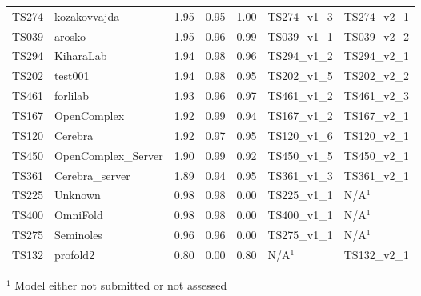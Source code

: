 \begin{table}[ht]
{\begin{tabular}{llrrrll}
TS274 & kozakovvajda & 1.95 & 0.95 & 1.00 & TS274\_v1\_3 & TS274\_v2\_1 \\ 
TS039 & arosko & 1.95 & 0.96 & 0.99 & TS039\_v1\_1 & TS039\_v2\_2 \\ 
TS294 & KiharaLab & 1.94 & 0.98 & 0.96 & TS294\_v1\_2 & TS294\_v2\_1 \\ 
TS202 & test001 & 1.94 & 0.98 & 0.95 & TS202\_v1\_5 & TS202\_v2\_2 \\ 
TS461 & forlilab & 1.93 & 0.96 & 0.97 & TS461\_v1\_2 & TS461\_v2\_3 \\ 
TS167 & OpenComplex & 1.92 & 0.99 & 0.94 & TS167\_v1\_2 & TS167\_v2\_1 \\ 
TS120 & Cerebra & 1.92 & 0.97 & 0.95 & TS120\_v1\_6 & TS120\_v2\_1 \\ 
TS450 & OpenComplex\_Server & 1.90 & 0.99 & 0.92 & TS450\_v1\_5 & TS450\_v2\_1 \\ 
TS361 & Cerebra\_server & 1.89 & 0.94 & 0.95 & TS361\_v1\_3 & TS361\_v2\_1 \\ 
TS225 & Unknown & 0.98 & 0.98 & 0.00 & TS225\_v1\_1 & N/A$^{1}$ \\ 
TS400 & OmniFold & 0.98 & 0.98 & 0.00 & TS400\_v1\_1 & N/A$^{1}$ \\ 
TS275 & Seminoles & 0.96 & 0.96 & 0.00 & TS275\_v1\_1 & N/A$^{1}$ \\ 
TS132 & profold2 & 0.80 & 0.00 & 0.80 & N/A$^{1}$ & TS132\_v2\_1 \\ 
\bottomrule
\end{tabular}%
}
\begin{flushleft}\footnotesize $^{1}$ Model either not submitted or not assessed\end{flushleft}
\end{table}
